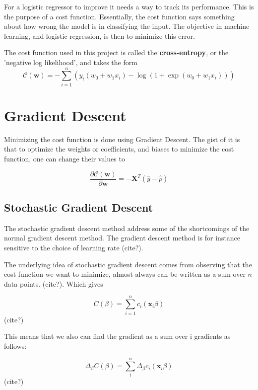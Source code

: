 For a logistic regressor to improve it needs a way to
track its performance. This is the purpose of a cost function. Essentially,
the cost function says something about how wrong the model is in classifying the
input. The objective in machine learning, and logistic regression, is then to minimize
this error.

The cost function used in this project is called the \textbf{cross-entropy}, or the
'negative log likelihood', and takes the form
\begin{equation}\label{eq:cross-entropy}
	\mathcal{C}(\boldsymbol{w})=-\sum_{i=1}^n  \left(y_i(w_0+w_1x_i) -\log{(1+\exp{(w_0+w_1x_i)})}\right)
\end{equation}

\section{Gradient Descent}\label{seq:gradient}
Minimizing the cost function is done using Gradient Descent.
The gist of it is that to optimize the weights or coefficients,
and biases to minimize the cost function, one can change their values to

\begin{equation}\label{eq:delta-c}
	\frac{\partial \mathcal{C}(\boldsymbol{w})}{\partial \boldsymbol{w}} = -\boldsymbol{X}^T\left(\hat{y}-\hat{p}\right)
\end{equation}

\subsection{Stochastic Gradient Descent}
The stochastic gradient descent method address some of the shortcomings
of the normal gradient descent method. The gradient descent method is
for instance sensitive to the choice of learning rate (cite?).

The underlying idea of stochastic gradient descent comes from observing
that the cost function we want to minimize, almost always can be written as
a sum over \(n\) data points. (cite?). Which gives

\begin{equation}
	C(\beta) = \sum\limits_{i=1}^n c_i (\mathbf{x}_i\beta)
\end{equation} (cite?)

This means that we also can find the gradient as a sum over i gradients
as follows:

\begin{equation}
	\Delta_{\beta} C(\beta) = \sum\limits_{i}^n \Delta_{\beta}c_i (\mathbf{x}_i\beta)
\end{equation} (cite?)

